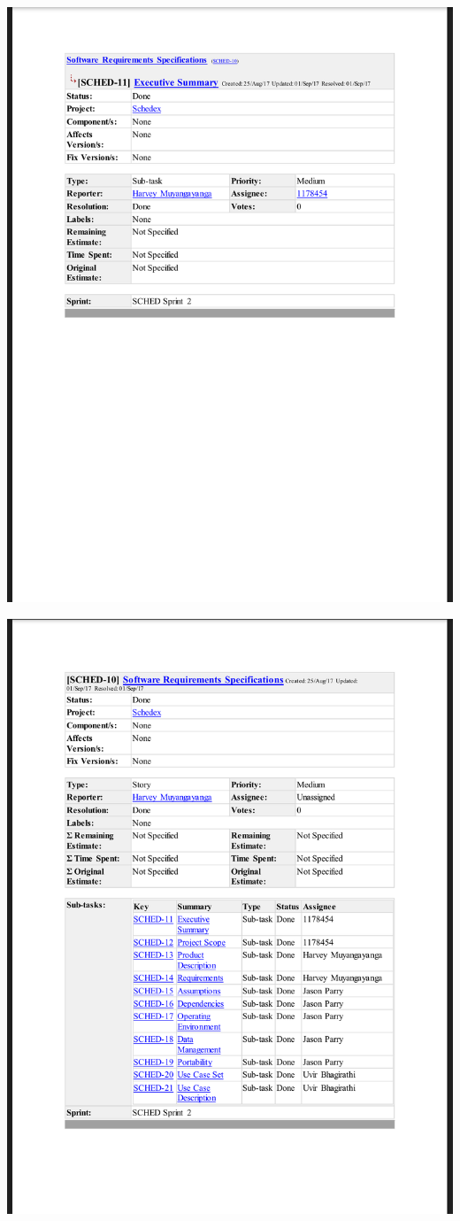 \documentclass{article}
\begin{document}
\centerline{\includegraphics[scale=0.4]{sprint2_10}}

\centerline{\includegraphics[scale=0.4]{sprint2_11}}
\end{document}
